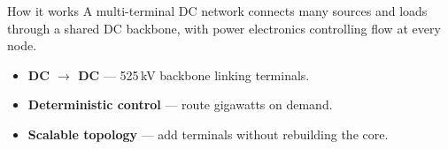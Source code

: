 
\begin{frame}{How it works}
  A multi-terminal DC network connects many sources and loads through a
  shared DC backbone, with power electronics controlling flow at every node.

  \vspace{0.8em}
  \begin{itemize}
    \setlength{\itemsep}{0.6em}
    \item \textbf{DC $\rightarrow$ DC} --- 525\,kV backbone linking terminals.
    \item \textbf{Deterministic control} --- route gigawatts on demand.
    \item \textbf{Scalable topology} --- add terminals without rebuilding the core.
  \end{itemize}
\end{frame}
